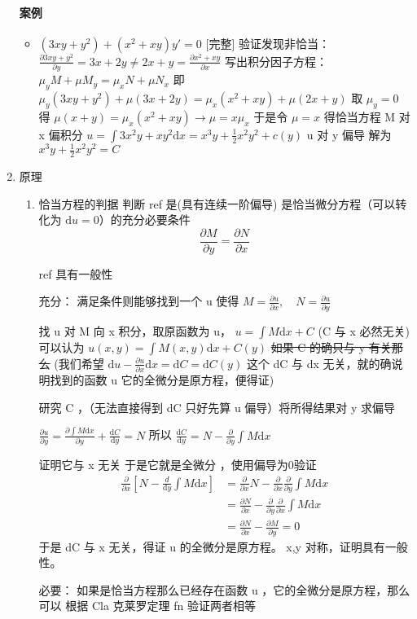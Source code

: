 \documentclass[11pt]{report}
\begin{document}
\begin{enumerate}
\paragraph{案例}
\begin{itemize}
\item \((3xy+y^2)+(x^2+xy)y'=0\) [完整]
验证发现非恰当： \(\frac{\partial 3xy+y^2}{\partial y}=3x+2y\neq2x+y= \frac{\partial x^2+xy}{\partial x}\)
写出积分因子方程： \(\mu_y M+\mu M_y=\mu_x N+\mu N_x\)
即 \(\mu_y (3xy+y^{2})+\mu (3x+2y)=\mu_x (x^2+xy)+\mu (2x+y)\)
取 \(\mu_y=0\)
得 \(\mu(x+y)=\mu_x(x^2+xy) \rightarrow \mu=x\mu_x\)
于是令 \(\mu=x\)
得恰当方程
M 对 x 偏积分 \(u=\int 3x^2y+xy^2\mathrm{d}x=x^3y+\frac{1}{2}x^2y^2+c(y)\)
u 对 y 偏导 
解为 \(x^3y+\frac{1}{2}x^2y^2=C\)
\end{itemize}
\item 原理
\label{sec:orgdc02fa1}
\begin{enumerate}
\item 恰当方程的判据
\label{sec:org68dbff3}
判断
ref
是(具有连续一阶偏导)
是恰当微分方程（可以转化为 \(\mathrm{d}u=0\)）的充分必要条件 $$\frac{\partial M}{\partial y}=\frac{\partial N}{\partial x}$$

ref
具有一般性

充分：
满足条件则能够找到一个 u 使得  \(M=\frac{\partial u}{\partial x},\quad N=\frac{\partial u}{\partial y}\)

找 u
对 M 向 x 积分，取原函数为 u， \(u=\int M \mathrm{d}x +C\)
(C 与 x 必然无关)可以认为  \(u(x,y)=\int M(x,y) \mathrm{d}x +C(y)\)
\sout{如果 C 的确只与 y 有关那么}
(我们希望 \(\mathrm{d}u-\frac{\partial u}{\partial x}\mathrm{d}x=\mathrm{d}C=\mathrm{d}C(y)\) 这个 dC 与 dx 无关，就的确说明找到的函数 u 它的全微分是原方程，便得证)

研究 C ，（无法直接得到 dC 只好先算 u 偏导）将所得结果对 y 求偏导

\(\frac{\partial u}{\partial y}=\frac{\partial\int M \mathrm{d}x}{\partial y}+\frac{\mathrm{d}C}{\mathrm{d}y}=N\)
所以 \(\frac{\mathrm{d}C}{\mathrm{d}y}=N-\frac{\partial}{\partial y}\int M \mathrm{d}x\)

证明它与 x 无关
于是它就是全微分
，使用偏导为0验证
\begin{equation}
\label{eq:22}
\begin{split}
\frac{\partial}{\partial x}[N-\frac{d}{\mathrm{d}y}\int M \mathrm{d}x] &=\frac{\partial}{\partial x}N-\frac{\partial}{\partial x}\frac{\partial}{\partial y}\int M \mathrm{d}x\\
&=\frac{\partial N}{\partial x}-\frac{\partial}{\partial y}\frac{\partial}{\partial x}\int M \mathrm{d}x \\
&=\frac{\partial N}{\partial x}-\frac{\partial M}{\partial y}=0
\end{split}
\end{equation}
于是 dC 与 x 无关，得证 u 的全微分是原方程。
x,y 对称，证明具有一般性。

必要：
如果是恰当方程那么已经存在函数 u ，它的全微分是原方程，那么
可以
根据
Cla
克莱罗定理
fn
验证两者相等
\end{enumerate}
\end{enumerate}
\end{document}
